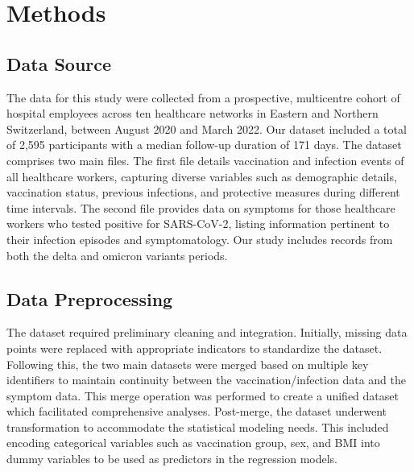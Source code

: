 \documentclass[11pt]{article}
\begin{document}
\section*{Methods}

\subsection*{Data Source}
The data for this study were collected from a prospective, multicentre cohort of hospital employees across ten healthcare networks in Eastern and Northern Switzerland, between August 2020 and March 2022. Our dataset included a total of 2,595 participants with a median follow-up duration of 171 days. The dataset comprises two main files. The first file details vaccination and infection events of all healthcare workers, capturing diverse variables such as demographic details, vaccination status, previous infections, and protective measures during different time intervals. The second file provides data on symptoms for those healthcare workers who tested positive for SARS-CoV-2, listing information pertinent to their infection episodes and symptomatology. Our study includes records from both the delta and omicron variants periods.

\subsection*{Data Preprocessing}
The dataset required preliminary cleaning and integration. Initially, missing data points were replaced with appropriate indicators to standardize the dataset. Following this, the two main datasets were merged based on multiple key identifiers to maintain continuity between the vaccination/infection data and the symptom data. This merge operation was performed to create a unified dataset which facilitated comprehensive analyses. Post-merge, the dataset underwent transformation to accommodate the statistical modeling needs. This included encoding categorical variables such as vaccination group, sex, and BMI into dummy variables to be used as predictors in the regression models.
\end{document}

